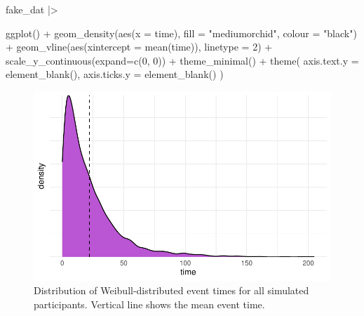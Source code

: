\documentclass[
  letterpaper,
  DIV=11,
  numbers=noendperiod]{scrreprt}
\newenvironment{Shaded}{\begin{snugshade}}{\end{snugshade}}
\newcommand{\AttributeTok}[1]{\textcolor[rgb]{0.40,0.45,0.13}{#1}}
\newcommand{\DecValTok}[1]{\textcolor[rgb]{0.68,0.00,0.00}{#1}}
\newcommand{\FunctionTok}[1]{\textcolor[rgb]{0.28,0.35,0.67}{#1}}
\newcommand{\NormalTok}[1]{\textcolor[rgb]{0.00,0.23,0.31}{#1}}
\newcommand{\SpecialCharTok}[1]{\textcolor[rgb]{0.37,0.37,0.37}{#1}}
\newcommand{\StringTok}[1]{\textcolor[rgb]{0.13,0.47,0.30}{#1}}
\begin{document}
\begin{Shaded}
\begin{Highlighting}[]
\NormalTok{fake\_dat }\SpecialCharTok{|\textgreater{}}

  \FunctionTok{ggplot}\NormalTok{() }\SpecialCharTok{+} 
  \FunctionTok{geom\_density}\NormalTok{(}\FunctionTok{aes}\NormalTok{(}\AttributeTok{x =}\NormalTok{ time), }\AttributeTok{fill =} \StringTok{"mediumorchid"}\NormalTok{, }\AttributeTok{colour =} \StringTok{"black"}\NormalTok{) }\SpecialCharTok{+}
  \FunctionTok{geom\_vline}\NormalTok{(}\FunctionTok{aes}\NormalTok{(}\AttributeTok{xintercept =} \FunctionTok{mean}\NormalTok{(time)), }\AttributeTok{linetype =} \DecValTok{2}\NormalTok{) }\SpecialCharTok{+}
  \FunctionTok{scale\_y\_continuous}\NormalTok{(}\AttributeTok{expand=}\FunctionTok{c}\NormalTok{(}\DecValTok{0}\NormalTok{, }\DecValTok{0}\NormalTok{)) }\SpecialCharTok{+}
  \FunctionTok{theme\_minimal}\NormalTok{() }\SpecialCharTok{+}
  \FunctionTok{theme}\NormalTok{(}
    \AttributeTok{axis.text.y =} \FunctionTok{element\_blank}\NormalTok{(),}
    \AttributeTok{axis.ticks.y =} \FunctionTok{element\_blank}\NormalTok{()}
\NormalTok{  )}
\end{Highlighting}
\end{Shaded}

\begin{figure}[H]

{\centering \includegraphics{./bayesian-cfa_files/figure-pdf/viz-weibull-samples-1.pdf}

}

\caption{Distribution of Weibull-distributed event times for all
simulated participants. Vertical line shows the mean event time.}

\end{figure}
\end{document}
